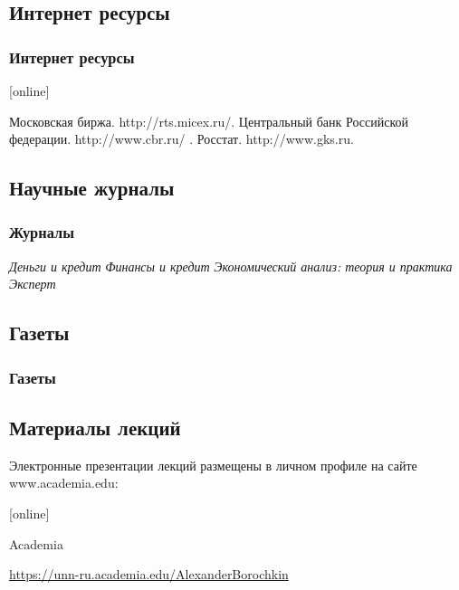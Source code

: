 \documentclass[_fin_decisions_lectures.tex]{subfiles}
\begin{document}
\subsection*{Интернет ресурсы}
\begin{frame}[allowframebreaks]
  \frametitle<presentation>{Интернет ресурсы}
    
  \begin{thebibliography}{10}
  
  [online]

    Московская биржа.
    \newblock http://rts.micex.ru/.
    Центральный банк Российской федерации.
    \newblock http://www.cbr.ru/ .
    Росстат.
    \newblock http://www.gks.ru.
  \end{thebibliography}
\end{frame}

\subsection*{Научные журналы}

\begin{frame}
  \frametitle<presentation>{Журналы}
    
  \begin{thebibliography}{10}
  
  \beamertemplatearticlebibitems
  \bibitem{}
  {\em Деньги и кредит}
  \bibitem{}
  	{\em Финансы и кредит}
  \bibitem{}
  	{\em Экономический анализ: теория и практика}
  \bibitem{}
  	{\em Эксперт}
  
  \end{thebibliography}
\end{frame}

\subsection*{Газеты}

\begin{frame}
  \frametitle<presentation>{Газеты}
    
  \begin{thebibliography}{10}
  
  \beamertemplatearticlebibitems
  \bibitem{}
  \bibitem{}
 
  \end{thebibliography}
\end{frame}

\subsection*{Материалы лекций}
\begin{frame}
Электронные презентации лекций размещены в личном профиле на сайте www.academia.edu:
\begin{thebibliography}{10}
	
	[online]
	
	Academia
	
	\footnotesize{\url{https://unn-ru.academia.edu/AlexanderBorochkin}}
\end{thebibliography}
\end{frame}
\end{document}
